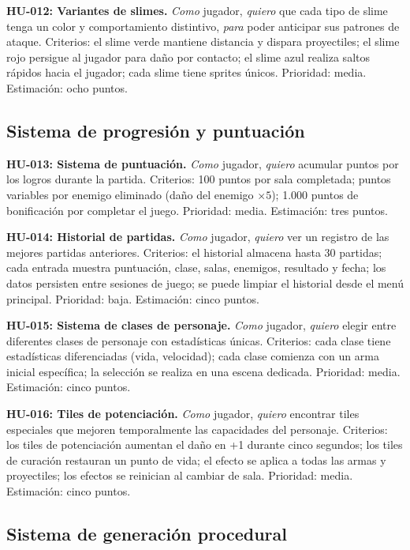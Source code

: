 \textbf{HU-012: Variantes de slimes.}
\textit{Como} jugador, \textit{quiero} que cada tipo de slime tenga un color y comportamiento distintivo, \textit{para} poder anticipar sus patrones de ataque. Criterios: el slime verde mantiene distancia y dispara proyectiles; el slime rojo persigue al jugador para daño por contacto; el slime azul realiza saltos rápidos hacia el jugador; cada slime tiene sprites únicos. Prioridad: media. Estimación: ocho puntos.

\subsection{Sistema de progresión y puntuación}


\textbf{HU-013: Sistema de puntuación.}
\textit{Como} jugador, \textit{quiero} acumular puntos por los logros durante la partida. Criterios: 100 puntos por sala completada; puntos variables por enemigo eliminado (daño del enemigo $\times 5$); 1.000 puntos de bonificación por completar el juego. Prioridad: media. Estimación: tres puntos.

\textbf{HU-014: Historial de partidas.}
\textit{Como} jugador, \textit{quiero} ver un registro de las mejores partidas anteriores. Criterios: el historial almacena hasta 30 partidas; cada entrada muestra puntuación, clase, salas, enemigos, resultado y fecha; los datos persisten entre sesiones de juego; se puede limpiar el historial desde el menú principal. Prioridad: baja. Estimación: cinco puntos.

\textbf{HU-015: Sistema de clases de personaje.}
\textit{Como} jugador, \textit{quiero} elegir entre diferentes clases de personaje con estadísticas únicas. Criterios: cada clase tiene estadísticas diferenciadas (vida, velocidad); cada clase comienza con un arma inicial específica; la selección se realiza en una escena dedicada. Prioridad: media. Estimación: cinco puntos.

\textbf{HU-016: Tiles de potenciación.}
\textit{Como} jugador, \textit{quiero} encontrar tiles especiales que mejoren temporalmente las capacidades del personaje. Criterios: los tiles de potenciación aumentan el daño en +1 durante cinco segundos; los tiles de curación restauran un punto de vida; el efecto se aplica a todas las armas y proyectiles; los efectos se reinician al cambiar de sala. Prioridad: media. Estimación: cinco puntos.

\subsection{Sistema de generación procedural}


